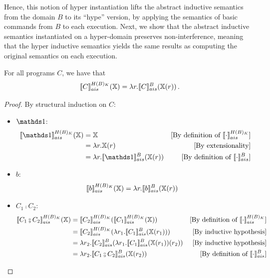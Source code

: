 \documentclass[
  10pt,       %
  twoside,    %
  a4paper,    %
  english,    %
  tikz,       %
  openright,  %
]{book}
\begin{document}
Hence, this notion of hyper instantiation lifts the abstract inductive semantics from
the domain $B$ to its ``hype'' version, by applying the semantics of basic commands
from $B$ to each execution.
Next, we show that the abstract inductive semantics instantiated on a
hyper-domain preserves non-interference, meaning that the hyper
inductive semantics yields the same results as computing the original semantics
on each execution.

\begin{theorem}
    \label{thm:hyper-add} For all programs $C$, we have that
    $$\asem[H(B)_K]{C}(\mathcal{\chi}) = \lambda r . \asem[B]{C}(\chi(r))\, .$$
\end{theorem}
\begin{proof}
  By structural induction on $C$:
  \begin{itemize}
    \item $\sskip$:
      \begin{align*}
        \asem[H(B)_K]{\sskip}(\chi) 
          &= \chi
          &\text{[By definition of $\asem[H(B)_K]{\cdot}$]} \\
          &= \lambda r . \chi(r) 
          &\text{[By extensionality]}\\
          &= \lambda r . \asem[B]{\sskip}(\chi(r))
          &\text{[By definition of $\asem[B]{\cdot}$]} \\
      \end{align*}

    \item $b$:
      \begin{align*}
        \asem[H(B)_K]{b}(\chi) 
          &= \lambda r . \asem[B]{b}(\chi(r))
      \end{align*}

    \item $C_1 \fcmp C_2$:
      \begin{align*}
        \asem[H(B)_K]{C_1 \fcmp C_2}(\chi) 
          &= \asem[H(B)_K]{C_2}(\asem[H(B)_K]{C_1}(\chi))
          &\text{[By definition of $\asem[H(B)_K]{\cdot}$]} \\
          &= \asem[H(B)_K]{C_2}(\lambda r_1 . \asem[B]{C_1}(\chi(r_1)))
          &\text{[By inductive hypothesis]} \\
          &= \lambda r_2 . \asem[B]{C_2}(\lambda r_1 . \asem[B]{C_1}(\chi(r_1))(r_2))
          &\text{[By inductive hypothesis]} \\
          &= \lambda r_2 . \asem[B]{C_1 \fcmp C_2}(\chi(r_2))
          &\text{[By definition of $\asem[B]{\cdot}$]} \\
      \end{align*}


\end{itemize}
\end{proof}
\end{document}
